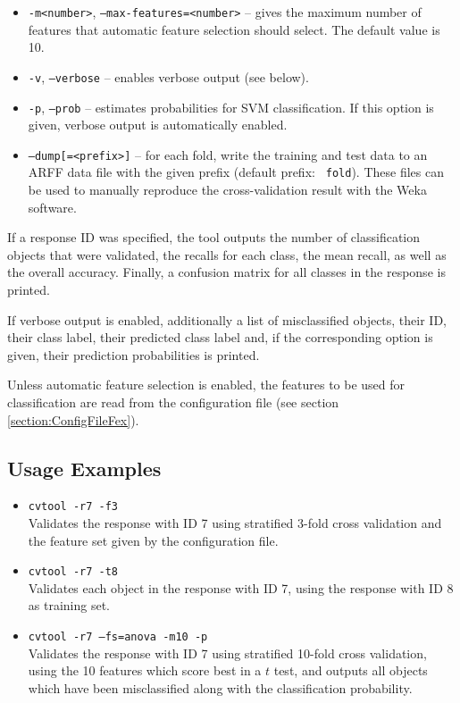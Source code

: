 \begin{itemize}
{      algorithm} is {\tt correlation}, features are rated by their correlation
    with their class label.
  \item {\tt -m<number>}, {\tt --max-features=<number>} -- gives the maximum
    number of features that automatic feature selection should select.  The
    default value is 10.
  \item {\tt -v}, {\tt --verbose} -- enables verbose output (see below).
  \item {\tt -p}, {\tt --prob} -- estimates probabilities for SVM
    classification. If this option is given, verbose output is automatically
    enabled.
  \item {\tt --dump[=<prefix>]} -- for each fold, write the training and test
    data to an ARFF data file with the given prefix (default prefix: {\tt
      fold}). These files can be used to manually reproduce the
    cross-validation result with the Weka \cite{Weka} software.
\end{itemize}

If a response ID was specified, the tool outputs the number of classification
objects that were validated, the recalls for each class, the mean recall, as
well as the overall accuracy. Finally, a confusion matrix for all classes in the
response is printed.

If verbose output is enabled, additionally a list of misclassified objects,
their ID, their class label, their predicted class label and, if the
corresponding option is given, their prediction probabilities is printed.

Unless automatic feature selection is enabled, the features to be used for
classification are read from the configuration file (see section
\ref{section:ConfigFileFex}).


\subsection{Usage Examples}

\begin{itemize}
  \item {\tt cvtool -r7 -f3}\\
    Validates the response with ID 7 using stratified 3-fold cross validation
    and the feature set given by the configuration file.
  \item {\tt cvtool -r7 -t8}\\
    Validates each object in the response with ID 7, using the response with ID
    8 as training set.
  \item {\tt cvtool -r7 --fs=anova -m10 -p}\\
    Validates the response with ID 7 using stratified 10-fold cross validation,
    using the 10 features which score best in a $t$ test, and outputs all
    objects which have been misclassified along with the classification
    probability.
\end{itemize}


